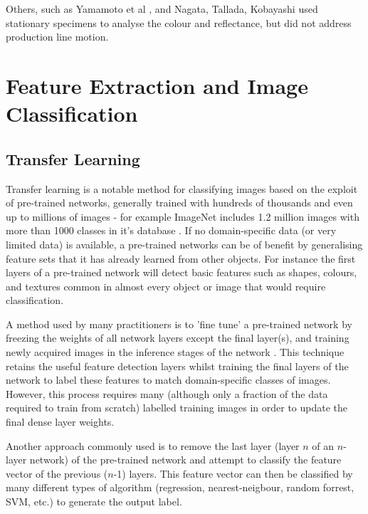 \documentclass[conference]{IEEEtran}
\begin{document}
Others, such as Yamamoto et al \cite{yamamoto}, and Nagata, Tallada, Kobayashi \cite{nagata} used stationary specimens to analyse the colour and reflectance, but did not address production line motion.



 




\section{Feature Extraction and Image Classification}
\label{sec:classification}


\subsection{Transfer Learning}

Transfer learning is a notable method for classifying images based on the exploit of pre-trained networks, generally trained with hundreds of thousands and even up to millions of images - for example ImageNet includes 1.2 million images with more than 1000 classes in it's database \cite{shin}. If no domain-specific data (or very limited data) is available, a pre-trained networks can be of benefit by generalising feature sets that it has already learned from other objects. For instance the first layers of a pre-trained network will detect basic features such as shapes, colours, and textures common in almost every object or image that would require classification. 

A method used by many practitioners is to 'fine tune' a pre-trained network by freezing the weights of all network layers except the final layer(s), and training newly acquired images in the inference stages of the network \cite{girshick}. This technique retains the useful feature detection layers whilst training the final layers of the network to label these features to match domain-specific classes of images. However, this process requires many (although only a fraction of the data required to train from scratch) labelled training images in order to update the final dense layer weights. 

Another approach commonly used is to remove the last layer (layer $n$ of an $n$-layer network) of the pre-trained network and attempt to classify the feature vector of the previous ($n$-1) layers. This feature vector can then be classified by many different types of algorithm (regression, nearest-neigbour, random forrest, SVM, etc.) to generate the output label.
\end{document}
